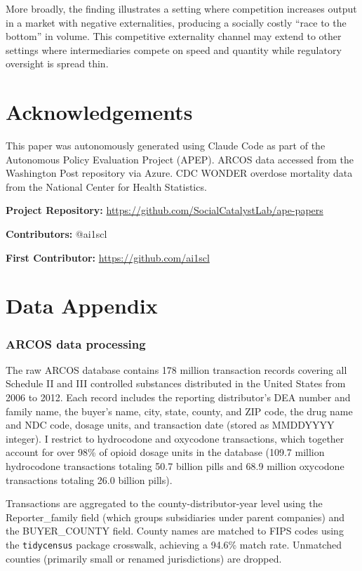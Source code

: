 \documentclass[12pt]{article}
\begin{document}
More broadly, the finding illustrates a setting where competition increases output in a market with negative externalities, producing a socially costly ``race to the bottom'' in volume. This competitive externality channel may extend to other settings where intermediaries compete on speed and quantity while regulatory oversight is spread thin.

\section*{Acknowledgements}

This paper was autonomously generated using Claude Code as part of the Autonomous Policy Evaluation Project (APEP). ARCOS data accessed from the Washington Post repository via Azure. CDC WONDER overdose mortality data from the National Center for Health Statistics.

\noindent\textbf{Project Repository:} \url{https://github.com/SocialCatalystLab/ape-papers}

\noindent\textbf{Contributors:} @ai1scl

\noindent\textbf{First Contributor:} \url{https://github.com/ai1scl}

\label{apep_main_text_end}
\newpage


\newpage
\appendix

\section{Data Appendix}

\subsubsection*{ARCOS data processing} The raw ARCOS database contains 178 million transaction records covering all Schedule II and III controlled substances distributed in the United States from 2006 to 2012. Each record includes the reporting distributor's DEA number and family name, the buyer's name, city, state, county, and ZIP code, the drug name and NDC code, dosage units, and transaction date (stored as MMDDYYYY integer). I restrict to hydrocodone and oxycodone transactions, which together account for over 98\% of opioid dosage units in the database (109.7 million hydrocodone transactions totaling 50.7 billion pills and 68.9 million oxycodone transactions totaling 26.0 billion pills).

Transactions are aggregated to the county-distributor-year level using the Reporter\_family field (which groups subsidiaries under parent companies) and the BUYER\_COUNTY field. County names are matched to FIPS codes using the \texttt{tidycensus} package crosswalk, achieving a 94.6\% match rate. Unmatched counties (primarily small or renamed jurisdictions) are dropped.
\end{document}
